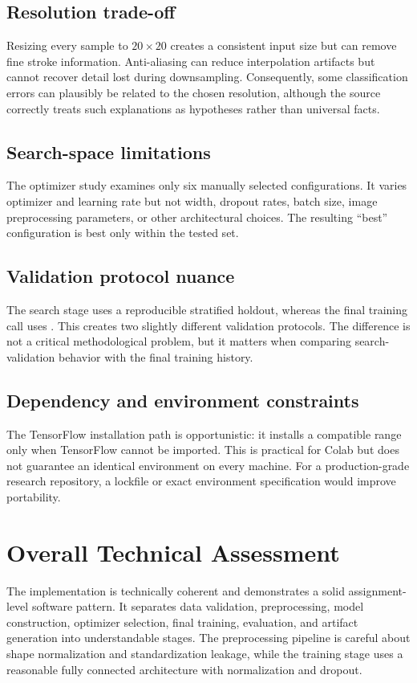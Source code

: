 \documentclass[11pt,a4paper]{article}
\newcommand{\code}[1]{\texttt{\detokenize{#1}}}
\begin{document}
\subsection{Resolution trade-off}
Resizing every sample to $20\times20$ creates a consistent input size but can remove fine stroke information. Anti-aliasing can reduce interpolation artifacts but cannot recover detail lost during downsampling. Consequently, some classification errors can plausibly be related to the chosen resolution, although the source correctly treats such explanations as hypotheses rather than universal facts.

\subsection{Search-space limitations}
The optimizer study examines only six manually selected configurations. It varies optimizer and learning rate but not width, dropout rates, batch size, image preprocessing parameters, or other architectural choices. The resulting ``best'' configuration is best only within the tested set.

\subsection{Validation protocol nuance}
The search stage uses a reproducible stratified holdout, whereas the final training call uses \code{validation_split=0.15}. This creates two slightly different validation protocols. The difference is not a critical methodological problem, but it matters when comparing search-validation behavior with the final training history.

\subsection{Dependency and environment constraints}
The TensorFlow installation path is opportunistic: it installs a compatible range only when TensorFlow cannot be imported. This is practical for Colab but does not guarantee an identical environment on every machine. For a production-grade research repository, a lockfile or exact environment specification would improve portability.

\section{Overall Technical Assessment}
The implementation is technically coherent and demonstrates a solid assignment-level software pattern. It separates data validation, preprocessing, model construction, optimizer selection, final training, evaluation, and artifact generation into understandable stages. The preprocessing pipeline is careful about shape normalization and standardization leakage, while the training stage uses a reasonable fully connected architecture with normalization and dropout.
\end{document}
